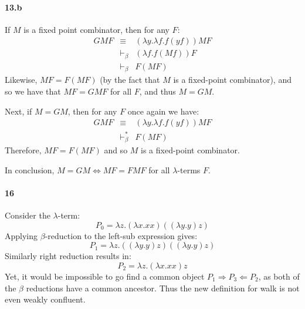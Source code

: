 \documentclass{article}
\begin{document}
\paragraph{13.b}
If $M$ is a fixed point combinator, then for any $F$:
\begin{eqnarray*}
GMF & \equiv & (\lambda y . \lambda f . f(yf)) M F\\
 & \vdash_\beta & (\lambda f . f(M f)) F \\
 & \vdash_\beta & F (M F)
\end{eqnarray*}
Likewise, $M F = F (M F)$ (by the fact that $M$ is a fixed-point combinator), and so we have that $M F = G M F$ for all $F$, and thus $M = G M$.

Next, if $M = GM$, then for any $F$ once again we have:
\begin{eqnarray*}
G M F & \equiv & (\lambda y . \lambda f . f (yf) ) M F \\
 & \vdash_\beta^* & F (M F)
\end{eqnarray*}
Therefore, $M F = F (M F)$ and so $M$ is a fixed-point combinator.

In conclusion, $M = GM \Leftrightarrow M F = F M F$ for all $\lambda$-terms $F$.

\paragraph{16}
Consider the $\lambda$-term:
\[ P_0 =  \lambda z . (\lambda x . x x)( (\lambda y . y) z ) \]
Applying $\beta$-reduction to the left-sub expression gives:
\[ P_1 =  \lambda z . ((\lambda y . y) z) ((\lambda y . y) z) \]
Similarly right reduction results in:
\[ P_2 =  \lambda z . (\lambda x . x x) z \]
Yet, it would be impossible to go find a common object $P_1 \Rightarrow P_3 \Leftarrow P_2$, as both of the $\beta$ reductions have a common ancestor.  Thus the new definition for walk is not even weakly confluent.
\end{document}
